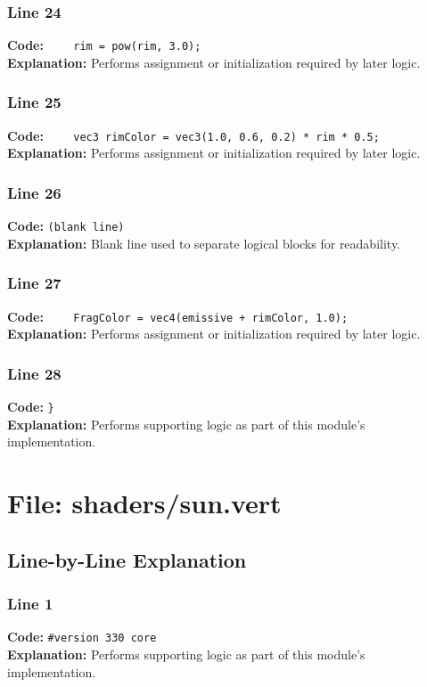 \documentclass[11pt,a4paper]{article}
\begin{document}
\subsubsection*{Line 24}
\textbf{Code:} \verb|    rim = pow(rim, 3.0);|\\
\textbf{Explanation:} Performs assignment or initialization required by later logic.

\subsubsection*{Line 25}
\textbf{Code:} \verb|    vec3 rimColor = vec3(1.0, 0.6, 0.2) * rim * 0.5;|\\
\textbf{Explanation:} Performs assignment or initialization required by later logic.

\subsubsection*{Line 26}
\textbf{Code:} \texttt{(blank line)}\\
\textbf{Explanation:} Blank line used to separate logical blocks for readability.

\subsubsection*{Line 27}
\textbf{Code:} \verb|    FragColor = vec4(emissive + rimColor, 1.0);|\\
\textbf{Explanation:} Performs assignment or initialization required by later logic.

\subsubsection*{Line 28}
\textbf{Code:} \verb|}|\\
\textbf{Explanation:} Performs supporting logic as part of this module's implementation.

\newpage
\section{File: shaders/sun.vert}
\subsection{Line-by-Line Explanation}
\subsubsection*{Line 1}
\textbf{Code:} \verb|#version 330 core|\\
\textbf{Explanation:} Performs supporting logic as part of this module's implementation.
\end{document}
